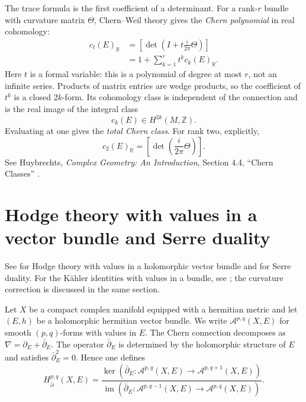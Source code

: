 \begin{remark}
\label{remark-chern-polynomial}
The trace formula is the first coefficient
of a determinant. For a rank-$r$ bundle
with curvature matrix $\Theta$, Chern--Weil
theory gives the \emph{Chern polynomial}
in real cohomology:
$$
\begin{aligned}
c_t(E)_{\mathbb{R}}
&=\left[\det\left(
I+t\frac{i}{2\pi}\Theta\right)\right]\\
&=1+\sum_{k=1}^r t^k c_k(E)_{\mathbb{R}}.
\end{aligned}
$$
Here $t$ is a formal variable: this is a
polynomial of degree at most $r$, not an
infinite series. Products of matrix entries
are wedge products, so the coefficient of
$t^k$ is a closed $2k$-form. Its cohomology
class is independent of the connection and
is the real image of the integral class
$$
c_k(E)\in H^{2k}(M,\mathbb{Z}).
$$
Evaluating at one gives the \emph{total Chern
class}. For rank two, explicitly,
$$
c_2(E)_{\mathbb{R}}
=\left[\det\left(
\frac{i}{2\pi}\Theta\right)\right].
$$
See Huybrechts, \emph{Complex Geometry:
An Introduction}, Section 4.4,
``Chern Classes'' \cite[Section 4.4]{huc}.
\end{remark}

\section{Hodge theory with values in a vector
bundle and Serre duality}
\label{section-bundle-valued-hodge-serre}

\begin{reference}
See \cite[Section 4.1]{huc} for Hodge theory
with values in a holomorphic vector bundle
and \cite[Proposition 4.1.15]{huc} for
Serre duality. For the Kähler identities
with values in a bundle, see
\cite[Lemma 5.2.3]{huc}; the curvature
correction is discussed in the same section.
\end{reference}

\noindent
Let $X$ be a compact complex manifold
equipped with a hermitian metric and let
$(E,h)$ be a holomorphic hermitian vector
bundle. We write
$
\mathcal A^{p,q}(X,E)
$
for smooth $(p,q)$-forms with values in $E$.
The Chern connection decomposes as
$
\nabla=\partial_E+\bar\partial_E.
$
The operator $\bar\partial_E$ is determined
by the holomorphic structure of $E$ and
satisfies
$
\bar\partial_E^2=0.
$
Hence one defines
$$
H^{p,q}_{\bar\partial}(X,E)
=
\frac{\ker(\bar\partial_E:
\mathcal A^{p,q}(X,E)\to
\mathcal A^{p,q+1}(X,E))}
{\operatorname{im}(\bar\partial_E:
\mathcal A^{p,q-1}(X,E)\to
\mathcal A^{p,q}(X,E))}.
$$


